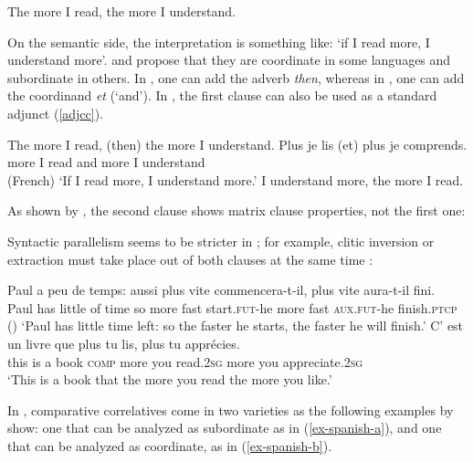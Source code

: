 \ea
The more I read, the more I understand. \label{cc0}
\z

On the semantic side, the interpretation is something like: `if I read more, I understand
more'. \citet{Abeille:06} and \citet{Abeille:Borsley:08} propose that they are  coordinate in some languages 
 and subordinate in others. In , one can add the adverb \emph{then}, whereas in , one can add the coordinand \emph{et} (`and'). In , the first clause can also be used as a standard adjunct (\ref{adjcc}).
 
\eal
\label{adjcc}
\ex The more I read, (then) the more I understand.
\ex 
\gll Plus je lis (et) plus je comprends.\\
     more I read \hphantom{(}and more I understand\\\hfill(French)
\glt `If I read more, I understand more.'
\ex I understand more, the more I read.
\zl


As shown by \citet[549--550]{culijack}, the second clause shows matrix clause properties, not the first one:

\eal
{}
\zl

Syntactic parallelism seems to be stricter in ; for example, clitic inversion or extraction
must take place out of both clauses at the same time \citep[]{Abeille:Borsley:08}:

\eal
\ex 
\gll Paul a     peu  de temps: aussi plus  vite commencera-t-il,  plus   vite  aura-t-il  fini.\\
     Paul has little of time so more fast start.\textsc{fut}-he more fast  \textsc{aux}.\textsc{fut}-he finish.\textsc{ptcp} \\\hfill{()}
\glt `Paul has little time left: so the faster he starts, the faster he will finish.'
\ex 
\gll C'   est un livre  que      plus   tu    lis, plus  tu    appr\'{e}cies. \\
     this is    a  book \textsc{comp} more you read.2\textsc{sg}  more you appreciate.2\textsc{sg} \\
\glt `This is a book that the more you read the more you like.'
\zl

In , comparative correlatives come in two varieties as the following examples by \citet[]{Abeille:Borsley:Espinal:06} show: one that can be analyzed as subordinate as in (\ref{ex-spanish-a}), and one that can be analyzed as coordinate, as in (\ref{ex-spanish-b}).


